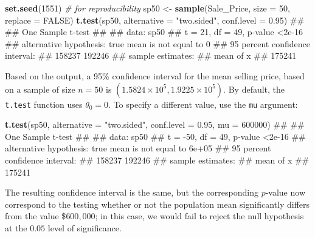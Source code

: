 \documentclass[]{book}
\newenvironment{Shaded}{\begin{snugshade}}{\end{snugshade}}
\newcommand{\CommentTok}[1]{\textcolor[rgb]{0.56,0.35,0.01}{\textit{#1}}}
\newcommand{\DataTypeTok}[1]{\textcolor[rgb]{0.13,0.29,0.53}{#1}}
\newcommand{\DecValTok}[1]{\textcolor[rgb]{0.00,0.00,0.81}{#1}}
\newcommand{\FloatTok}[1]{\textcolor[rgb]{0.00,0.00,0.81}{#1}}
\newcommand{\KeywordTok}[1]{\textcolor[rgb]{0.13,0.29,0.53}{\textbf{#1}}}
\newcommand{\NormalTok}[1]{#1}
\newcommand{\OtherTok}[1]{\textcolor[rgb]{0.56,0.35,0.01}{#1}}
\newcommand{\StringTok}[1]{\textcolor[rgb]{0.31,0.60,0.02}{#1}}
\theoremstyle{definition}
\theoremstyle{definition}
\theoremstyle{definition}
\theoremstyle{remark}
\begin{document}
\begin{Shaded}
\begin{Highlighting}[]
\KeywordTok{set.seed}\NormalTok{(}\DecValTok{1551}\NormalTok{)  }\CommentTok{# for reproducibility}
\NormalTok{sp50 <-}\StringTok{ }\KeywordTok{sample}\NormalTok{(Sale_Price, }\DataTypeTok{size =} \DecValTok{50}\NormalTok{, }\DataTypeTok{replace =} \OtherTok{FALSE}\NormalTok{)}
\KeywordTok{t.test}\NormalTok{(sp50, }\DataTypeTok{alternative =} \StringTok{"two.sided"}\NormalTok{, }\DataTypeTok{conf.level =} \FloatTok{0.95}\NormalTok{)}
\NormalTok{## }
\NormalTok{##  One Sample t-test}
\NormalTok{## }
\NormalTok{## data:  sp50}
\NormalTok{## t = 21, df = 49, p-value <2e-16}
\NormalTok{## alternative hypothesis: true mean is not equal to 0}
\NormalTok{## 95 percent confidence interval:}
\NormalTok{##  158237 192246}
\NormalTok{## sample estimates:}
\NormalTok{## mean of x }
\NormalTok{##    175241}
\end{Highlighting}
\end{Shaded}

Based on the output, a 95\% confidence interval for the mean selling
price, based on a sample of size \(n = 50\) is
\(\left(1.5824\times 10^{5}, 1.9225\times 10^{5}\right)\). By default,
the \texttt{t.test} function uses \(\theta_0 = 0\). To specify a
different value, use the \texttt{mu} argument:

\begin{Shaded}
\begin{Highlighting}[]
\KeywordTok{t.test}\NormalTok{(sp50, }\DataTypeTok{alternative =} \StringTok{"two.sided"}\NormalTok{, }\DataTypeTok{conf.level =} \FloatTok{0.95}\NormalTok{, }\DataTypeTok{mu =} \DecValTok{600000}\NormalTok{)}
\NormalTok{## }
\NormalTok{##  One Sample t-test}
\NormalTok{## }
\NormalTok{## data:  sp50}
\NormalTok{## t = -50, df = 49, p-value <2e-16}
\NormalTok{## alternative hypothesis: true mean is not equal to 6e+05}
\NormalTok{## 95 percent confidence interval:}
\NormalTok{##  158237 192246}
\NormalTok{## sample estimates:}
\NormalTok{## mean of x }
\NormalTok{##    175241}
\end{Highlighting}
\end{Shaded}

The resulting confidence interval is the same, but the corresponding
\(p\)-value now correspond to the testing whether or not the population
mean significantly differs from the value \$\(600,000\); in this case,
we would fail to reject the null hypothesis at the \(0.05\) level of
significance.
\end{document}
